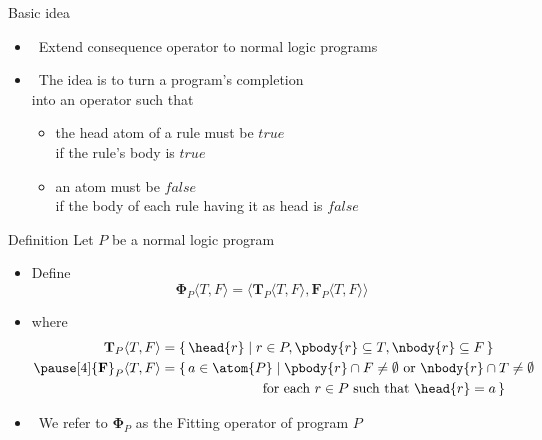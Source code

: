 \begin{frame}{Basic idea}
  \bigskip
  \begin{itemize}
  \item {} \ Extend consequence operator to normal logic programs
    \medskip
  \item {} \
    The idea is to turn a program's completion\\ into an operator such that
    \smallskip
    \begin{itemize}\normalsize
    \item the head atom of a rule must be $\mathit{true}$\\
      if the rule's body is $\mathit{true}$
    \item an atom must be $\mathit{false}$\\
      if the body of each rule having it as head is $\mathit{false}$
    \end{itemize}
  \end{itemize}
  \nocite{fitting02a}
\end{frame}
\begin{frame}{Definition}
  Let $P$ be a normal logic program
  \medskip
  \begin{itemize}
  \item<2-> Define
    \[
    {\mathbf{\Phi}}_P\langle T,F \rangle
    =
    \langle
    {\mathbf{T}}_P\langle T,F \rangle,
    {\mathbf{F}}_P\langle T,F \rangle
    \rangle
    \]
  \item<3-> []
    where
    \begin{align*}
      {\mathbf{T}}_P\langle T,F \rangle
      & =
      \{\, \head{r} \mid r \in P, \pbody{r} \subseteq T, \nbody{r} \subseteq F \,\}
      \\\pause[4]
      {\mathbf{F}}_P\langle T,F \rangle
      & =
      \{\, a \in \atom{P} \mid
      \pbody{r} \cap F \neq \emptyset
      \text{ or }
      \nbody{r} \cap T \neq \emptyset
      \\
      & \kern 71pt
      \text{ for each } r \in P
      \text{ such that }
      \head{r} = a
      \,\}
    \end{align*}
  \item<5->  \ We refer to ${\mathbf{\Phi}}_P$ as the \alert{Fitting operator} of program $P$
  \end{itemize}
\end{frame}
